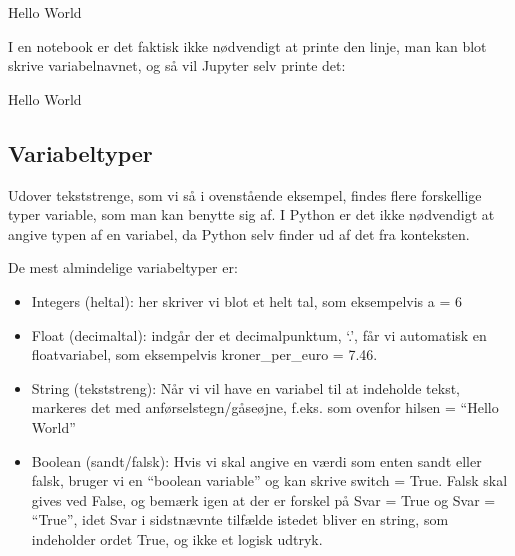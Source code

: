 \documentclass[letterpaper,10pt,english]{jupyterBook}
\begin{document}
\begin{sphinxVerbatim}[commandchars=\\\{\}]
Hello World
\end{sphinxVerbatim}

I en notebook er det faktisk ikke nødvendigt at printe den  linje, man kan blot skrive variabelnavnet, og så vil Jupyter selv printe det:

\begin{sphinxVerbatim}[commandchars=\\\{\}]
\end{sphinxVerbatim}

\begin{sphinxVerbatim}[commandchars=\\\{\}]
\PYGZsq{}Hello World\PYGZsq{}
\end{sphinxVerbatim}


\subsection{Variabeltyper}
\label{\detokenize{notebooks/Basal_python:variabeltyper}}
Udover tekststrenge, som vi så i ovenstående eksempel, findes flere forskellige typer variable, som man kan benytte sig af. I Python er det ikke nødvendigt at angive typen af en variabel, da Python selv finder ud af det fra konteksten.

De mest almindelige variabeltyper er:
\begin{itemize}
\item {} 
Integers (heltal): her skriver vi blot et helt tal, som eksempelvis a = 6

\item {} 
Float (decimaltal): indgår der et decimalpunktum, ‘.’, får vi automatisk en float\sphinxhyphen{}variabel, som eksempelvis kroner\_per\_euro = 7.46.

\item {} 
String (tekststreng): Når vi vil have en variabel til at indeholde tekst, markeres det med anførselstegn/gåseøjne, f.eks. som ovenfor hilsen = “Hello World”

\item {} 
Boolean (sandt/falsk): Hvis vi skal angive en værdi som enten sandt eller falsk, bruger vi en “boolean variable” og kan skrive switch = True. Falsk skal gives ved False, og bemærk igen at der er forskel på Svar = True og Svar = “True”, idet Svar i sidstnævnte tilfælde istedet bliver en string, som indeholder ordet True, og ikke et logisk udtryk.

\end{itemize}
\end{document}
